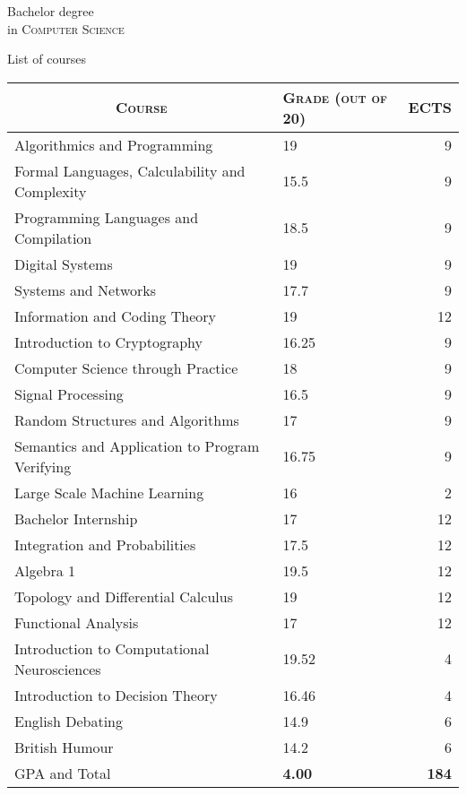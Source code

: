 \documentclass[a4paper,10pt]{article} %
\begin{document}
\vspace{1em}


\clearpage
\par{\centering\Large \hypertarget{notes}{Bachelor degree \\in \textsc{Computer
      Science}}\par}\large{\centering List of courses\par}\normalsize

\begin{center}
\begin{tabular}{llr}
  \multicolumn{1}{c}{\textsc{Course}} & \textsc{Grade (out of 20)}&\textsc{ECTS}\\ \hline
  Algorithmics and Programming & 19 & 9 \\
  Formal Languages, Calculability and Complexity & 15.5 & 9 \\
  Programming Languages and Compilation & 18.5 & 9 \\
  Digital Systems & 19 & 9 \\
  Systems and Networks & 17.7 & 9 \\
  Information and Coding Theory & 19 & 12 \\
  Introduction to Cryptography & 16.25 & 9 \\
  Computer Science through Practice & 18 & 9 \\
  Signal Processing & 16.5 & 9 \\
  Random Structures and Algorithms & 17 & 9 \\
  Semantics and Application to Program Verifying & 16.75 & 9 \\
  Large Scale Machine Learning & 16 & 2 \\
  Bachelor Internship & 17 & 12 \\
  \hline
  Integration and Probabilities & 17.5 & 12 \\
  Algebra 1 & 19.5 & 12 \\
  Topology and Differential Calculus & 19 & 12 \\
  Functional Analysis & 17 & 12 \\
  \hline
  Introduction to Computational Neurosciences & 19.52 & 4 \\
  Introduction to Decision Theory & 16.46 & 4 \\
  \hline
  English Debating & 14.9 & 6 \\
  British Humour & 14.2 & 6 \\
  \hline
  \textsc{GPA} and Total & \textbf{4.00} & \textbf{184}
\end{tabular}
\end{center}
\end{document}
